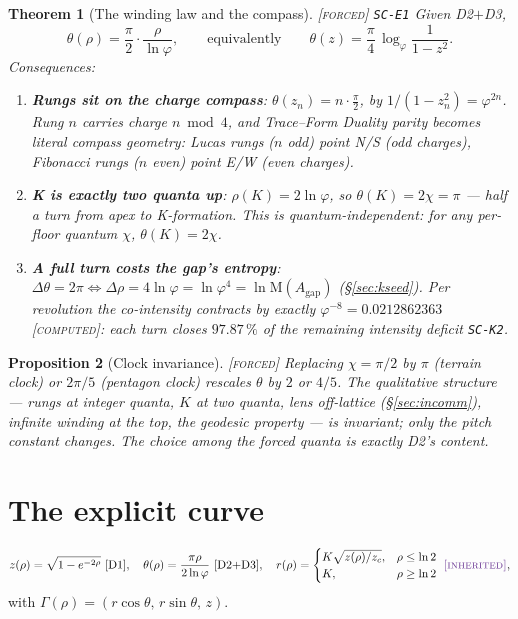 \documentclass[11pt]{article}
\newcommand{\tagF}{\textcolor{cF}{\textsc{[forced]}}}
\newcommand{\tagC}{\textcolor{cC}{\textsc{[computed]}}}
\newcommand{\tagI}{\textcolor{cI}{\textsc{[inherited]}}}
\newcommand{\hx}[1]{\textcolor{cC}{\footnotesize\texttt{#1}}}
\newcommand{\gp}{\varphi}
\newcommand{\gapc}{\mathrm{gap}}
\newcommand{\M}{\mathrm{M}}
\theoremstyle{plain}
\newtheorem{theorem}{Theorem}[section]
\newtheorem{proposition}[theorem]{Proposition}
\theoremstyle{definition}
\theoremstyle{remark}
\begin{document}
\begin{theorem}[The winding law and the compass]\label{thm:winding}\tagF{} \hx{SC-E1}
Given D2$+$D3,
\[
\theta(\rho)=\frac{\pi}{2}\cdot\frac{\rho}{\ln\gp},
\qquad\text{equivalently}\qquad
\theta(z)=\frac{\pi}{4}\,\log_\gp\!\frac{1}{1-z^2}.
\]
Consequences:
\begin{enumerate}[nosep,label=(\roman*)]
\item \textbf{Rungs sit on the charge compass}: $\theta(z_n)=n\cdot\tfrac\pi2$, by
$1/(1-z_n^2)=\gp^{2n}$. Rung $n$ carries charge $n\bmod4$, and Trace--Form Duality
parity becomes literal compass geometry: Lucas rungs ($n$ odd) point N/S (odd
charges), Fibonacci rungs ($n$ even) point E/W (even charges).
\item \textbf{K is exactly two quanta up}: $\rho(K)=2\ln\gp$, so
$\theta(K)=2\chi=\pi$ --- half a turn from apex to K-formation. This is
quantum-independent: for any per-floor quantum $\chi$, $\theta(K)=2\chi$.
\item \textbf{A full turn costs the gap's entropy}:
$\Delta\theta=2\pi\iff\Delta\rho=4\ln\gp=\ln\gp^4=\ln\M(A_{\gapc})$
(\S\ref{sec:kseed}). Per revolution the co-intensity contracts by exactly
$\gp^{-8}=0.0212862363$ \tagC{}: each turn closes $97.87\,\%$ of the remaining
intensity deficit \hx{SC-K2}.
\end{enumerate}
\end{theorem}

\begin{proposition}[Clock invariance]\label{prop:invariance}\tagF{}
Replacing $\chi=\pi/2$ by $\pi$ (terrain clock) or $2\pi/5$ (pentagon clock) rescales
$\theta$ by $2$ or $4/5$. The qualitative structure --- rungs at integer quanta, $K$
at two quanta, lens off-lattice (\S\ref{sec:incomm}), infinite winding at the top,
the geodesic property --- is invariant; only the pitch constant changes. The choice
among the forced quanta is exactly D2's content.
\end{proposition}

\section{The explicit curve}\label{sec:curve}

\begin{equation}\label{eq:gamma}
z(\rho)=\sqrt{1-e^{-2\rho}}\ \text{[D1]},\quad
\theta(\rho)=\frac{\pi\rho}{2\ln\gp}\ \text{[D2$+$D3]},\quad
r(\rho)=\begin{cases}K\sqrt{z(\rho)/z_c},&\rho\le\ln2\\ K,&\rho\ge\ln2\end{cases}\ \tagI{},
\end{equation}
with $\Gamma(\rho)=(r\cos\theta,\,r\sin\theta,\,z)$.
\end{document}
